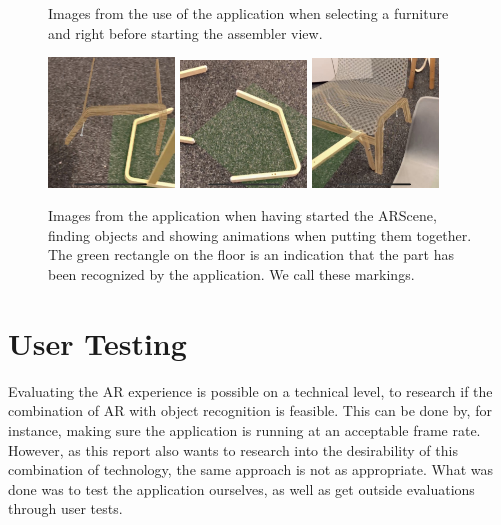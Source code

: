 \begin{figure}[!hbtp]
\begin{center}
\caption{Images from the use of the application when selecting a furniture and right before starting the assembler view.}
\label{fig:applicationSelection}
\end{center}
\end{figure}

\begin{figure}[!hbtp]
\begin{center}
\includegraphics[width = 0.3\textwidth]{./Images/Application4}
\includegraphics[width = 0.3\textwidth]{./Images/Application5}
\includegraphics[width = 0.3\textwidth]{./Images/Application6}
\caption{Images from the application when having started the ARScene, finding objects and showing animations when putting them together. The green rectangle on the floor is an indication that the part has been recognized by the application. We call these markings.}
\label{fig:applicationAssembler}
\end{center}
\end{figure}

\section{User Testing}
\label{sec:usertest}
Evaluating the AR experience is possible on a technical level, to research if the 
combination of AR with object recognition is feasible. This can be done by, for instance,  
making sure the application is running at an acceptable frame rate. However, as this 
report also wants to research into the desirability of this combination of technology, the 
same approach is not as appropriate. What was done was to test the 
application ourselves, as well as get outside evaluations through user tests.

